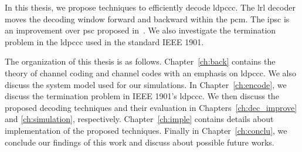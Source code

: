 In this thesis, we propose techniques to efficiently decode \gls{ldpccc}. The \gls{lrl} decoder moves the decoding window forward and backward within the \gls{pcm}. The \gls{ipsc} is an improvement over \gls{psc} proposed in~\cite{Kang2018}. We also investigate the termination problem in the \gls{ldpccc} used in the standard IEEE 1901.

The organization of this thesis is as follows. Chapter~\ref{ch:back} contains the theory of channel coding and channel codes with an emphasis on \gls{ldpccc}. We also discuss the system model used for our simulations. In Chapter~\ref{ch:encode}, we discuss the termination problem in IEEE 1901's \gls{ldpccc}. We then discuss the proposed decoding techniques and their evaluation in Chapters~\ref{ch:dec_improve} and \ref{ch:simulation}, respectively. Chapter~\ref{ch:imple} contains details about implementation of the proposed techniques. Finally in Chapter~\ref{ch:conclu}, we conclude our findings of this work and discuss about possible future works.